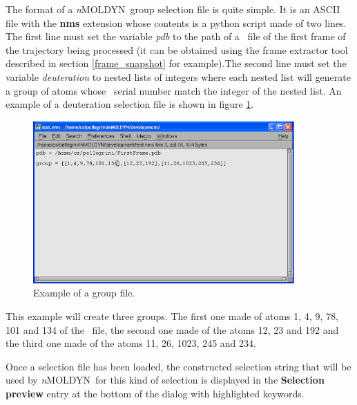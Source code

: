 \documentclass[a4paper,11pt]{report}
\newcommand{\NMOLDYN}{\textit{n}MOLDYN}
\begin{document}
The format of a \NMOLDYN\ group selection file is quite simple. It is an ASCII file with the \textbf{nms} extension whose 
contents is a python script made of two lines. The first line must set the variable \textit{pdb} to the path of a \PDB\ file 
of the first frame of the trajectory being processed (it can be obtained using the frame extractor tool described in 
section \ref{frame_snapshot} for example).The second line must set the variable \textit{deuteration} to nested lists of 
integers where each nested list will generate a group of atoms whose \PDB\ serial number match the integer of the nested list. 
An example of a deuteration selection file is shown in figure \ref{fig:group_selection_file}.
\begin{figure}[h!]
\begin{center}
\includegraphics[width=10cm]{Figures/group_selection_file.eps}
\end{center}
\caption[Example of a group selection file]{Example of a group file.}
\label{fig:group_selection_file}
\end{figure}   

This example will create three groups. The first one made of atoms 1, 4, 9, 78, 101 and 134 of the \PDB\ file, the second one made of the 
atoms 12, 23 and 192 and the third one made of the atoms 11, 26, 1023, 245 and 234.

Once a selection file has been loaded, the constructed selection string that will be used by \NMOLDYN\ for this kind of 
selection is displayed in the \textbf{Selection preview} entry at the bottom of the dialog with highlighted keywords.
\end{document}
